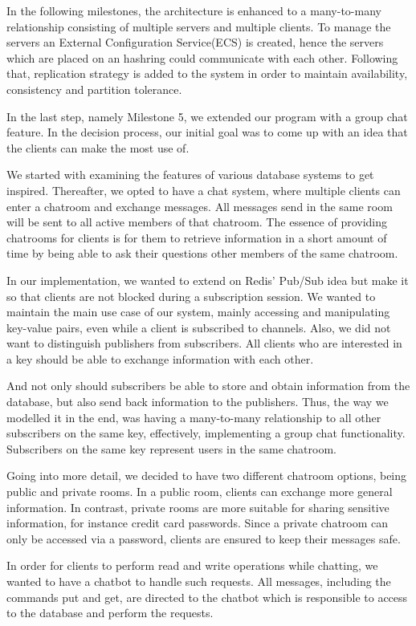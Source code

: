 In the following milestones, the architecture is enhanced to a many-to-many relationship consisting of multiple servers and multiple clients. To manage the servers an External Configuration Service(ECS) is created, hence the servers which are placed on an hashring could communicate with each other. Following that, replication strategy is added to the system in order to maintain availability, consistency and partition tolerance. 

In the last step, namely Milestone 5, we extended our program with a group chat feature. In the decision process, our initial goal was to come up with an idea that the clients can make the most use of.

We started with examining the features of various database systems to get inspired. Thereafter, we opted to have a chat system, where multiple clients can enter a chatroom and exchange messages. All messages send in the same room will be sent to all active members of that chatroom. The essence of providing chatrooms for clients is for them to retrieve information in a short amount of time by being able to ask their questions other members of the same chatroom. 

In our implementation, we wanted to extend on Redis’ Pub/Sub
idea but make it so that clients are not blocked during a subscription session. We wanted to maintain the main use case of our system, mainly accessing and manipulating key-value pairs, even while a client is subscribed to channels. Also, we did not want to distinguish publishers from subscribers. All clients who are interested in a key should be able to exchange information with each other.

And not only should subscribers be able to store and obtain
information from the database, but also send back information
to the publishers. Thus, the way we modelled it in the end, was
having a many-to-many relationship to all other subscribers on
the same key, effectively, implementing a group chat functionality. Subscribers on the same key represent users in the same chatroom.

Going into more detail, we decided to have two different chatroom options, being public and private rooms. In a public room, clients can exchange more general information. In contrast, private rooms are more suitable for sharing sensitive information, for instance credit card passwords. Since a private chatroom can only be accessed via a password, clients are ensured to keep their messages safe.

In order for clients to perform read and write operations while chatting, we wanted to have a chatbot to handle such requests. All messages, including the commands put and get, are directed to the chatbot which is responsible to access to the database and perform the requests.
